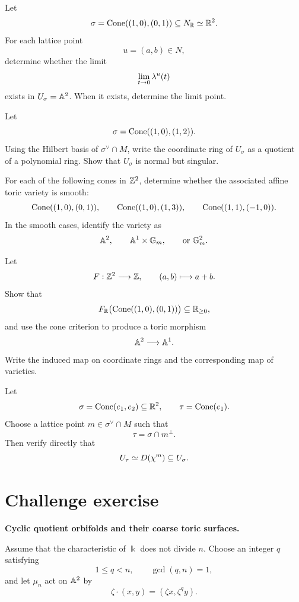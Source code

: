 \begin{exercises}
\item Let
\[
\sigma=\operatorname{Cone}((1,0),(0,1))\subseteq N_{\mathbb{R}}\simeq\mathbb{R}^2.
\]
For each lattice point
\[
u=(a,b)\in N,
\]
determine whether the limit
\[
\lim_{t\to0}\lambda^{u}(t)
\]
exists in \(U_\sigma=\mathbb{A}^2\). When it exists, determine the limit
point.

\item Let
\[
\sigma=\operatorname{Cone}((1,0),(1,2)).
\]
Using the Hilbert basis of \(\sigma^\vee\cap M\), write the coordinate
ring of \(U_\sigma\) as a quotient of a polynomial ring. Show that
\(U_\sigma\) is normal but singular.

\item For each of the following cones in \(\mathbb{Z}^2\), determine whether
the associated affine toric variety is smooth:
\[
\operatorname{Cone}((1,0),(0,1)),\qquad
\operatorname{Cone}((1,0),(1,3)),\qquad
\operatorname{Cone}((1,1),(-1,0)).
\]
In the smooth cases, identify the variety as
\[
\mathbb{A}^2,\qquad
\mathbb{A}^1\times\mathbb{G}_{m},\qquad
\text{or }\mathbb{G}_{m}^2.
\]

\item Let
\[
F:\mathbb{Z}^2\longrightarrow\mathbb{Z},
\qquad
(a,b)\longmapsto a+b.
\]
Show that
\[
F_{\mathbb{R}}\bigl(\operatorname{Cone}((1,0),(0,1))\bigr)\subseteq\mathbb{R}_{\geq0},
\]
and use the cone criterion to produce a toric morphism
\[
\mathbb{A}^2\longrightarrow\mathbb{A}^1.
\]
Write the induced map on coordinate rings and the corresponding map of
varieties.

\item Let
\[
\sigma=\operatorname{Cone}(e_1,e_2)\subseteq\mathbb{R}^2,
\qquad
\tau=\operatorname{Cone}(e_1).
\]
Choose a lattice point \(m\in\sigma^\vee\cap M\) such that
\[
\tau=\sigma\cap m^\perp.
\]
Then verify directly that
\[
U_\tau
\simeq
D(\chi^{m})
\subseteq
U_\sigma.
\]

\end{exercises}

\clearpage
\section*{Challenge exercise}

\noindent
\textbf{Cyclic quotient orbifolds and their coarse toric surfaces.}

\medskip

Assume that the characteristic of \(\Bbbk\) does not divide \(n\).
Choose an integer \(q\) satisfying
\[
1\leq q<n,
\qquad
\gcd(q,n)=1,
\]
and let \(\mu_n\) act on \(\mathbb{A}^2\) by
\[
\zeta\cdot(x,y)
=
(\zeta x,\zeta^q y).
\]

